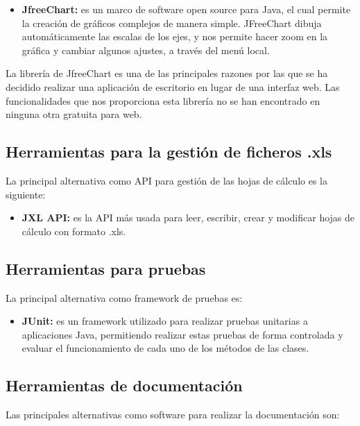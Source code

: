\documentclass[12pt, a4paper]{book}
\begin{document}
\begin{itemize}
	\item \textbf{JfreeChart:\label{jfreechart}} es un marco de software open source para Java, el cual permite la creación de gráficos complejos de manera simple. JFreeChart dibuja automáticamente las escalas de los ejes, y nos permite hacer zoom en la gráfica y cambiar algunos ajustes, a través del menú local.
\end{itemize}

La librería de JfreeChart es una de las principales razones por las que se ha decidido realizar una aplicación de escritorio en lugar de una interfaz web. Las funcionalidades que nos proporciona esta librería no se han encontrado en ninguna otra gratuita para web.

\subsection{Herramientas para la gestión de ficheros .xls}

La principal alternativa como \gls{API} para gestión de las hojas de cálculo es la siguiente:

\begin{itemize}
	\item \textbf{JXL API:} es la \gls{API} más usada para leer, escribir, crear y modificar hojas de cálculo con formato .xls.
\end{itemize}

\subsection{Herramientas para pruebas}

La principal alternativa como framework de pruebas es:

\begin{itemize}
	\item \textbf{JUnit:} es un framework utilizado para realizar pruebas unitarias a aplicaciones Java, permitiendo realizar estas pruebas de forma controlada y evaluar el funcionamiento de cada uno de los métodos de las clases.
\end{itemize}

\subsection{Herramientas de documentación}

Las principales alternativas como software para realizar la documentación son:
\end{document}
